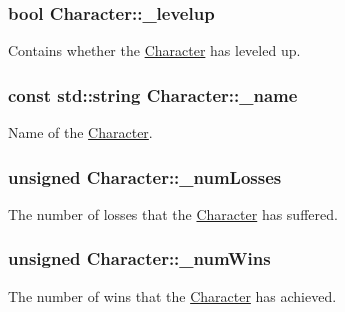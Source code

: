 \subsubsection[{\+\_\+levelup}]{\setlength{\rightskip}{0pt plus 5cm}bool Character\+::\+\_\+levelup\hspace{0.3cm}{\ttfamily [protected]}}\label{class_character_a7d661e1d0a7631b0c5a2a06ef0165090}
Contains whether the \hyperlink{class_character}{Character} has leveled up. \hypertarget{class_character_aa86be1de1ef615913a552b2134fbb966}{}
\subsubsection[{\+\_\+name}]{\setlength{\rightskip}{0pt plus 5cm}const std\+::string Character\+::\+\_\+name\hspace{0.3cm}{\ttfamily [protected]}}\label{class_character_aa86be1de1ef615913a552b2134fbb966}
Name of the \hyperlink{class_character}{Character}. \hypertarget{class_character_a0f2af69ac7a82ebff650b1a430bb4331}{}
\subsubsection[{\+\_\+num\+Losses}]{\setlength{\rightskip}{0pt plus 5cm}unsigned Character\+::\+\_\+num\+Losses\hspace{0.3cm}{\ttfamily [protected]}}\label{class_character_a0f2af69ac7a82ebff650b1a430bb4331}
The number of losses that the \hyperlink{class_character}{Character} has suffered. \hypertarget{class_character_a68d70b5ab4f09cd2a74524fc3d162d3d}{}
\subsubsection[{\+\_\+num\+Wins}]{\setlength{\rightskip}{0pt plus 5cm}unsigned Character\+::\+\_\+num\+Wins\hspace{0.3cm}{\ttfamily [protected]}}\label{class_character_a68d70b5ab4f09cd2a74524fc3d162d3d}
The number of wins that the \hyperlink{class_character}{Character} has achieved. \hypertarget{class_character_ab3b89d967b817bc3e199ed70f6b6277a}{}
